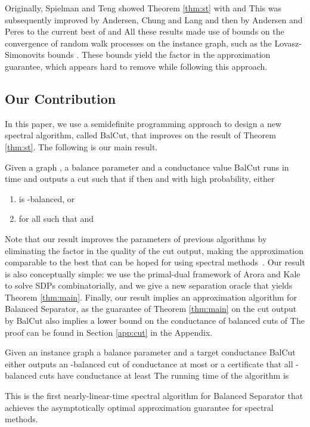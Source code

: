 \documentclass[twoside,leqno,twocolumn]{article}
\newcommand{\BS}{{\sc Balanced Separator}\xspace}
\newcommand{\SDP}{{\sf SDP}\xspace}
\numberwithin{equation}{section}
\newcommand{\alg}{{\sc BalCut}\xspace}
\begin{document}
\noindent
Originally, Spielman and Teng showed Theorem \ref{thm:st} with  and  This was subsequently improved by Andersen, Chung and Lang \cite{ACL} and then by Andersen and Peres \cite{AP} to the current best of  and  All these results made use of bounds on the convergence of random walk processes on the instance graph, such as the Lovasz-Simonovits bounds \cite{LS}. These bounds yield the  factor in the approximation guarantee, which appears hard to remove while following this approach.

\subsection{Our Contribution}


In this paper,  we use a semidefinite programming approach to design a new spectral algorithm, called {\sc BalCut}, that improves on the result of Theorem \ref{thm:st}. The following is our main result. 


\begin{theorem} \label{thm:main}
Given a graph  , a balance parameter  and a conductance value  {\sc BalCut} runs in time  and outputs a cut   such that   if  then   and with high probability, either
\begin{enumerate}
\item  is -balanced, or 
\item for all  such that  and   

\end{enumerate} 
\end{theorem}


\noindent
Note that our result improves the parameters  of previous algorithms by eliminating the  factor in the quality of the cut output, making the approximation comparable to the best that can be hoped for using spectral methods~\cite{GM}. Our result is also conceptually simple: we use the primal-dual framework of Arora and Kale \cite{AK} to solve {\SDP}s combinatorially, and we give a new separation oracle that yields  Theorem \ref{thm:main}.
Finally, our result implies an approximation algorithm for {\BS}, as the guarantee of Theorem \ref{thm:main} on the cut  output by \alg also implies a lower bound on the conductance of balanced cuts of  The proof can be found in Section \ref{app:cut} in the Appendix.
\begin{corollary}\label{cor:cut}
Given an instance graph  a balance parameter  and a target conductance  \alg either outputs an -balanced cut of conductance at most  or a certificate that all -balanced cuts have conductance at least  The running time of the algorithm is 
\end{corollary}
This is the first nearly-linear-time spectral algorithm for \BS that achieves the asymptotically optimal approximation guarantee for spectral methods.
\end{document}
